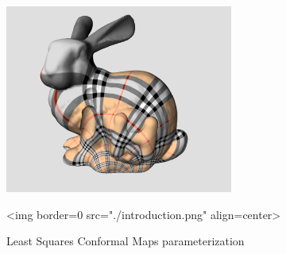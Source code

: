 \begin{figure}[bht]
    \begin{center}
        \begin{ccTexOnly}
            \includegraphics{Parameterization/introduction} %
        \end{ccTexOnly}
        \begin{ccHtmlOnly}
            <img border=0 src="./introduction.png" align=center>
        \end{ccHtmlOnly}
        \label{parameterization-fig-introduction}

        \caption{Least Squares Conformal Maps parameterization}
    \end{center}
\end{figure}


